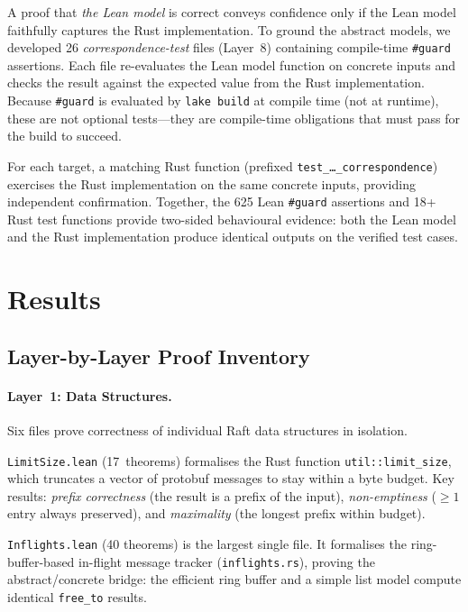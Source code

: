 \documentclass[sigconf,10pt]{acmart}
\begin{document}
A proof that \emph{the Lean model} is correct conveys confidence only if
the Lean model faithfully captures the Rust implementation.
To ground the abstract models, we developed 26 \emph{correspondence-test}
files (Layer~8) containing compile-time \texttt{\#guard} assertions.  Each
file re-evaluates the Lean model function on concrete inputs and checks
the result against the expected value from the Rust implementation.
Because \texttt{\#guard} is evaluated by \texttt{lake build} at compile time
(not at runtime), these are not optional tests---they are compile-time
obligations that must pass for the build to succeed.

For each target, a matching Rust function (prefixed \texttt{test\_\ldots\_correspondence})
exercises the Rust implementation on the same concrete inputs, providing
independent confirmation.  Together, the 625 Lean \texttt{\#guard}
assertions and 18+ Rust test functions provide two-sided behavioural
evidence: both the Lean model and the Rust implementation produce
identical outputs on the verified test cases.

\section{Results}

\label{sec:results}

\subsection{Layer-by-Layer Proof Inventory}

\paragraph{Layer~1: Data Structures.}
Six files prove correctness of individual Raft data structures in isolation.

\texttt{LimitSize.lean} (17~theorems) formalises the Rust function
\texttt{util::limit\_size}, which truncates a vector of protobuf
messages to stay within a byte budget.
Key results: \emph{prefix correctness} (the result is a prefix of
the input), \emph{non-emptiness} ($\geq 1$ entry always preserved), and
\emph{maximality} (the longest prefix within budget).

\texttt{Inflights.lean} (40 theorems) is the largest single file.  It
formalises the ring-buffer-based in-flight message tracker (\texttt{inflights.rs}),
proving the abstract/concrete bridge: the efficient ring buffer and a
simple list model compute identical \texttt{free\_to} results.
\end{document}
